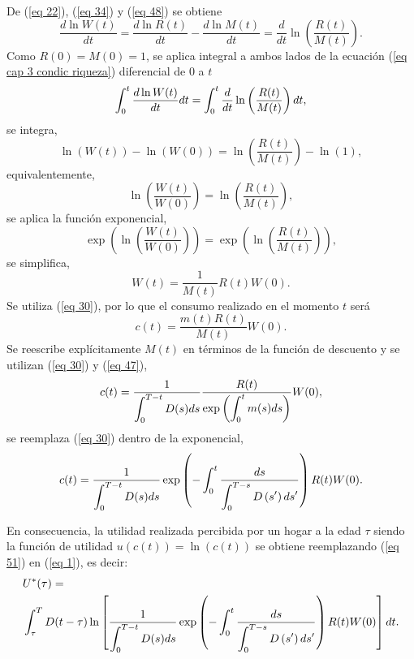 \noindent De (\ref{eq 22}), (\ref{eq 34}) y (\ref{eq 48}) se obtiene
\begin{equation}
    \label{eq cap 3 condic riqueza}
    \dfrac{d \ln W(t)}{dt}= \dfrac{d \ln R(t)}{dt}-    \dfrac{d \ln M(t)}{dt}= \dfrac{d}{dt} \ln \left( \dfrac{R(t)}{M(t)} \right).
\end{equation}
Como $R(0) = M(0) = 1$, se aplica integral a ambos lados de la ecuación (\ref{eq cap 3 condic riqueza}) diferencial de $0$ a $t$ 
$$ \displaystyle \int_0^t{\dfrac{d \ln W(t)}{dt} dt}=\displaystyle \int_0^t{\dfrac{d}{dt} \ln \left( \dfrac{R(t)}{M(t)}\right) dt},$$
se integra,
$$\ln(W(t))- \ln(W(0))=\ln\left(\dfrac{R(t)}{M(t)}\right)-\ln(1),$$
equivalentemente,
$$\ln\left(\dfrac{W(t)}{W(0)}\right)=\ln\left(\dfrac{R(t)}{M(t)}\right),$$
se aplica la función exponencial,
$$\exp\left( \ln\left(\dfrac{W(t)}{W(0)}\right)\right)=\exp \left(\ln\left(\dfrac{R(t)}{M(t)}\right) \right),$$
se simplifica,
\begin{equation}
\label{eq 49}
    W(t) = \dfrac{1}{M(t)}R(t) W(0).
\end{equation}
Se utiliza (\ref{eq 30}), por lo que el consumo realizado en el momento $t$ será
\begin{equation}
\label{eq 50}
    c(t) = \dfrac{m(t)R(t)}{M(t)}W(0).
\end{equation}
Se reescribe explícitamente $M(t)$ en términos de la función de descuento y se utilizan (\ref{eq 30}) y (\ref{eq 47}),
$$c(t)=\dfrac{1}{\displaystyle \int_0^{T-t} D(s) d s} \dfrac{R(t)}{\exp\left( \displaystyle \int_0^t m(s) ds \right)}W(0),$$
se reemplaza (\ref{eq 30}) dentro de la exponencial,
\begin{equation}
\label{eq 51}
c(t)=\dfrac{1}{\displaystyle \int_0^{T-t} D(s) d s} \exp \left(-\displaystyle \int_0^t \dfrac{d s}{\displaystyle \int_0^{T-s} D\left(s^{\prime}\right) d s^{\prime}}\right) R(t) W(0).
\end{equation}

En consecuencia, la utilidad realizada percibida por un hogar a la edad $\tau$ siendo la función de utilidad $u(c(t))=\ln(c(t))$ se obtiene reemplazando (\ref{eq 51}) en (\ref{eq 1}), es decir:
\begin{equation}
\label{eq 52}
\begin{aligned}
& U^*(\tau)= \\
& \displaystyle \int_\tau^T D(t-\tau) \ln \left[\dfrac{1}{\displaystyle \int_0^{T-t} D(s) d s} \exp \left(-\displaystyle \int_0^t \dfrac{d s}{\displaystyle \int_0^{T-s} D\left(s^{\prime}\right) d s^{\prime}}\right) R(t) W(0)\right] d t.
\end{aligned}
\end{equation}

